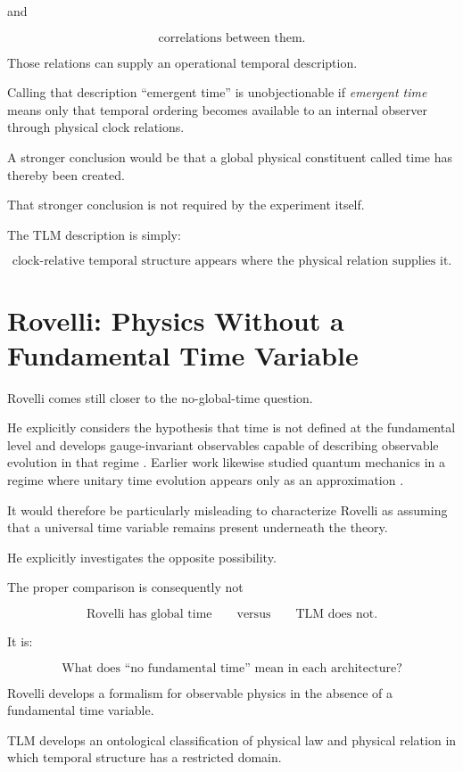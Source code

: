 \documentclass[12pt,onecolumn]{article}
\theoremstyle{plain}
\theoremstyle{definition}
\theoremstyle{remark}
\begin{document}
and

\[
\text{correlations between them}.
\]

Those relations can supply an operational temporal description.

Calling that description ``emergent time'' is unobjectionable if
\emph{emergent time} means only that temporal ordering becomes available
to an internal observer through physical clock relations.

A stronger conclusion would be that a global physical constituent called
time has thereby been created.

That stronger conclusion is not required by the experiment itself.

The TLM description is simply:

\[
\boxed{
\text{clock-relative temporal structure appears where the physical relation
supplies it}.
}
\]


\section{Rovelli: Physics Without a Fundamental Time Variable}

Rovelli comes still closer to the no-global-time question.

He explicitly considers the hypothesis that time is not defined at the
fundamental level and develops gauge-invariant observables capable of
describing observable evolution in that regime \cite{rovelli1991}. Earlier
work likewise studied quantum mechanics in a regime where unitary time
evolution appears only as an approximation \cite{rovelli1990}.

It would therefore be particularly misleading to characterize Rovelli as
assuming that a universal time variable remains present underneath the
theory.

He explicitly investigates the opposite possibility.

The proper comparison is consequently not

\[
\text{Rovelli has global time}
\qquad\text{versus}\qquad
\text{TLM does not}.
\]

It is:

\[
\boxed{
\text{What does ``no fundamental time'' mean in each architecture?}
}
\]

Rovelli develops a formalism for observable physics in the absence of a
fundamental time variable.

TLM develops an ontological classification of physical law and physical
relation in which temporal structure has a restricted domain.
\end{document}
